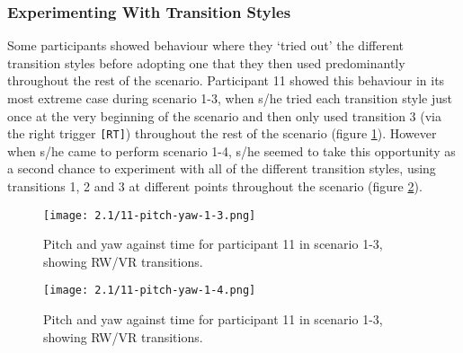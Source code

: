 
\subsubsection{Experimenting With Transition Styles}

Some participants showed behaviour where they `tried out' the different transition styles before adopting one that they then used predominantly throughout the rest of the scenario. Participant 11 showed this behaviour in its most extreme case during scenario 1-3, when s/he tried each transition style just once at the very beginning of the scenario and then only used transition 3 (via the right trigger \texttt{[RT]}) throughout the rest of the scenario (figure \ref{11-pitch-yaw-1-3.png}). However when s/he came to perform scenario 1-4, s/he seemed to take this opportunity as a second chance to experiment with all of the different transition styles, using transitions 1, 2 and 3 at different points throughout the scenario (figure \ref{11-pitch-yaw-1-4.png}).

\begin{figure}[h]
	\begin{center}
	\texttt{[image: 2.1/11-pitch-yaw-1-3.png]}
	\caption{Pitch and yaw against time for participant 11 in scenario 1-3, showing RW/VR transitions.}
	\label{11-pitch-yaw-1-3.png}
	\end{center}
\end{figure}

\begin{figure}[h]
	\begin{center}
	\texttt{[image: 2.1/11-pitch-yaw-1-4.png]}
	\caption{Pitch and yaw against time for participant 11 in scenario 1-3, showing RW/VR transitions.}
	\label{11-pitch-yaw-1-4.png}
	\end{center}
\end{figure}



